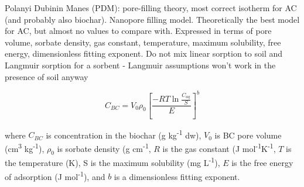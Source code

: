 Polanyi Dubinin Manes (PDM): pore-filling theory, most correct isotherm for AC (and probably also biochar). Nanopore filling model. Theoretically the best model for AC, but almost no values to compare with. Expressed in terms of pore volume, sorbate density, gas constant, temperature, maximum solubility, free energy, dimensionless fitting exponent. 
Do not mix linear sorption to soil and Langmuir sorption for a sorbent - Langmuir assumptions won't work in the presence of soil anyway

\begin{equation} \label{eq:PDM}
    C_{BC} = V_0\rho_0 \left [ \frac{-RT\ln \frac{C_{aq}}{S}}{E}\right ]^b
\end{equation}


where $C_{BC}$ is concentration in the biochar (g kg\textsuperscript{-1} dw), $V_0$ is BC pore volume (cm\textsuperscript{3} kg\textsuperscript{-1}), $\rho_0$ is sorbate density (g cm\textsuperscript{-1}, $R$ is the gas constant (J mol\textsuperscript{-1}K\textsuperscript{-1}, $T$ is the temperature (K), S is the maximum solubility (mg L\textsuperscript{-1}), $E$ is the free energy of adsorption (J mol\textsuperscript{-1}), and $b$ is a dimensionless fitting exponent. 

